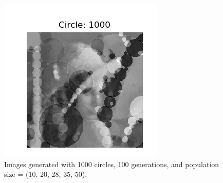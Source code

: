 \documentclass[12pt]{article}
\begin{document}
\begin{figure}[H]
\noindent\includegraphics[width=\textwidth/6]{../results/lenna/lenna_pop50}
\caption{Images generated with 1000 circles, 100 generations, and population size = (10, 20, 28, 35, 50). }
\label{fig:lenna_pop}
\end{figure}
\end{document}

